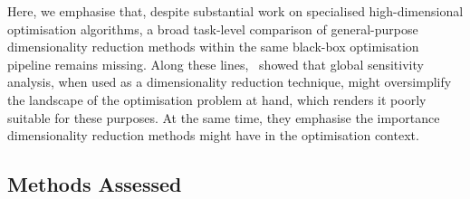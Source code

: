Here, we emphasise that, despite substantial work on specialised high-dimensional optimisation algorithms, a broad task-level comparison of general-purpose dimensionality reduction methods within the same black-box optimisation pipeline remains missing.
Along these lines,~\citet{RapEtAl25} showed that global sensitivity analysis, when used as a dimensionality reduction technique, might oversimplify the landscape of the optimisation problem at hand, which renders it poorly suitable for these purposes.
At the same time, they emphasise the importance dimensionality reduction methods might have in the optimisation context.

\subsection{Methods Assessed}
\label{sec:ch05:dimensionality reduction-methods}


